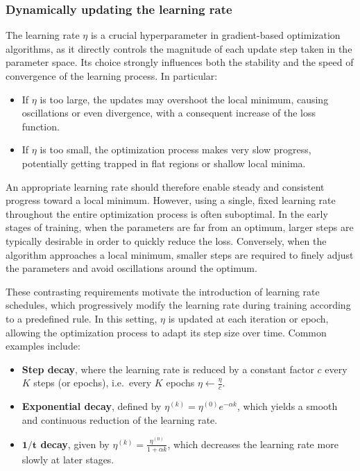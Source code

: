 \subsubsection*{Dynamically updating the learning rate}
The learning rate $\eta$ is a crucial hyperparameter in gradient-based optimization algorithms, as it directly controls the magnitude of each update step taken in the parameter space. Its choice strongly influences both the stability and the speed of convergence of the learning process. In particular:
\begin{itemize}
\item If $\eta$ is too large, the updates may overshoot the local minimum, causing oscillations or even divergence, with a consequent increase of the loss function.
\item If $\eta$ is too small, the optimization process makes very slow progress, potentially getting trapped in flat regions or shallow local minima.
\end{itemize}
An appropriate learning rate should therefore enable steady and consistent progress toward a local minimum. However, using a single, fixed learning rate throughout the entire optimization process is often suboptimal. In the early stages of training, when the parameters are far from an optimum, larger steps are typically desirable in order to quickly reduce the loss. Conversely, when the algorithm approaches a local minimum, smaller steps are required to finely adjust the parameters and avoid oscillations around the optimum.

These contrasting requirements motivate the introduction of \alert{learning rate schedules}, which progressively modify the learning rate during training according to a predefined rule. In this setting, $\eta$ is updated at each iteration or epoch, allowing the optimization process to adapt its step size over time. Common examples include:
\begin{itemize}
\item \textbf{Step decay}, where the learning rate is reduced by a constant factor $c$ every $K$ steps (or epochs), i.e.\ every $K$ epochs $\displaystyle \eta \leftarrow \frac{\eta}{c}$.
\item \textbf{Exponential decay}, defined by $\displaystyle \eta^{(k)} = \eta^{(0)} e^{-\alpha k}$, which yields a smooth and continuous reduction of the learning rate.
\item \textbf{$\boldsymbol{1/t}$ decay}, given by $\displaystyle \eta^{(k)} = \frac{\eta^{(0)}}{1 + \alpha k}$, which decreases the learning rate more slowly at later stages.
\end{itemize}

